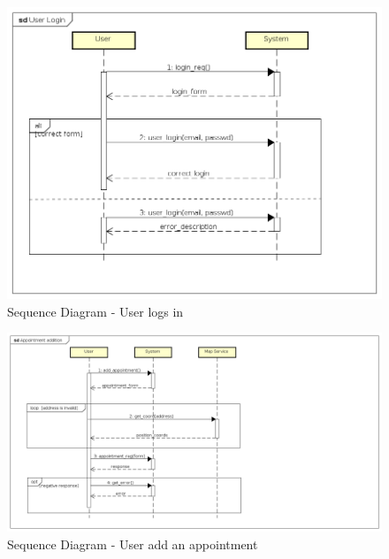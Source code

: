 \begin{figure}
	\centering
	\includegraphics{Images/SequenceDiagrams/2_User_Login.png}
	\caption{\label{fig: sequenceDiagram2}Sequence Diagram - User logs in  }
\end{figure}

\begin{figure}
	\centering
	\includegraphics{Images/SequenceDiagrams/3_Appointment_addition.png}
	\caption{\label{fig: sequenceDiagram3}Sequence Diagram - User add an appointment  }
\end{figure}

